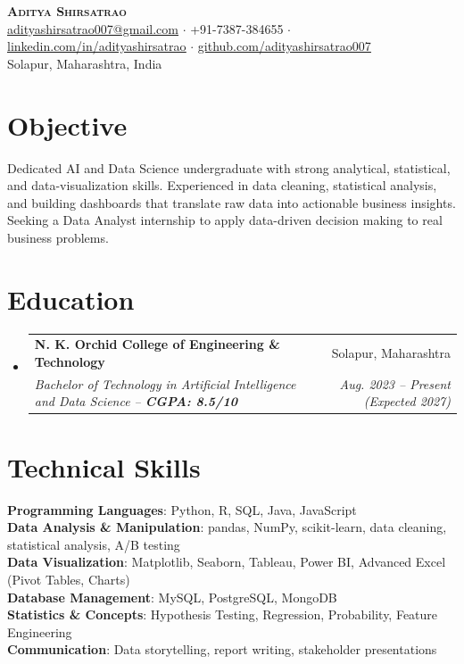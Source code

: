 \documentclass[letterpaper,11pt]{article}
\makeatletter
\newcommand{\resumeSubheading}[4]{
  \vspace{-2pt}\item
    \begin{tabular*}{0.97\textwidth}[t]{l@{\extracolsep{\fill}}r}
      \textbf{#1} & #2 \\
      \textit{\small#3} & \textit{\small #4} \\
    \end{tabular*}\vspace{-7pt}
}
\newcommand{\resumeSubHeadingListStart}{\begin{itemize}[leftmargin=0.15in, label={}]}
\newcommand{\resumeSubHeadingListEnd}{\end{itemize}}
\makeatother
\begin{document}
\begin{center}
    \textbf{\Huge \scshape Aditya Shirsatrao} \\ \vspace{3pt}
    \small
    \href{mailto:adityashirsatrao007@gmail.com}{\underline{adityashirsatrao007@gmail.com}} $\cdot$
    +91-7387-384655 $\cdot$
    \href{https://www.linkedin.com/in/adityashirsatrao}{\underline{linkedin.com/in/adityashirsatrao}} $\cdot$
    \href{https://github.com/adityashirsatrao007}{\underline{github.com/adityashirsatrao007}} \\
    \small Solapur, Maharashtra, India
\end{center}

\section{Objective}
  \small{Dedicated AI and Data Science undergraduate with strong analytical, statistical, and data-visualization skills. Experienced in data cleaning, statistical analysis, and building dashboards that translate raw data into actionable business insights. Seeking a Data Analyst internship to apply data-driven decision making to real business problems.}

\section{Education}
  \resumeSubHeadingListStart
    \resumeSubheading
      {N. K. Orchid College of Engineering \& Technology}{Solapur, Maharashtra}
      {Bachelor of Technology in Artificial Intelligence and Data Science -- \textbf{CGPA: 8.5/10}}{Aug. 2023 -- Present (Expected 2027)}
  \resumeSubHeadingListEnd

\section{Technical Skills}
 \begin{itemize}[leftmargin=0.15in, label={}]
    \small{\item{
     \textbf{Programming Languages}{: Python, R, SQL, Java, JavaScript} \\
     \textbf{Data Analysis \& Manipulation}{: pandas, NumPy, scikit-learn, data cleaning, statistical analysis, A/B testing} \\
     \textbf{Data Visualization}{: Matplotlib, Seaborn, Tableau, Power BI, Advanced Excel (Pivot Tables, Charts)} \\
     \textbf{Database Management}{: MySQL, PostgreSQL, MongoDB} \\
     \textbf{Statistics \& Concepts}{: Hypothesis Testing, Regression, Probability, Feature Engineering} \\
     \textbf{Communication}{: Data storytelling, report writing, stakeholder presentations}
    }}
  \end{itemize}
\end{document}
